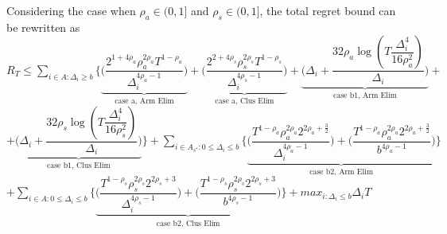 \begin{remark}
\label{App:C:Rem:1}
Considering the case when $\rho_{a}\in (0,1]$ and $\rho_{s}\in (0,1]$, the total regret bound can be rewritten as
\newline $R_{T}\leq \sum_{i\in A:\Delta_{i}\geq b} \bigg\lbrace \underbrace{\bigg(\dfrac{2^{1+4\rho_{a}}\rho_{a}^{2\rho_{a}}T^{1-\rho_{a}}}{\Delta_{i}^{4\rho_{a}-1}}\bigg)}_{\text{case a, Arm Elim}} + \underbrace{\bigg(\dfrac{2^{2+4\rho_{s}}\rho_{s}^{2\rho_{s}}T^{1-\rho_{s}}}{\Delta_{i}^{4\rho_{s}-1}}\bigg)}_{\text{case a, Clus Elim}} + \underbrace{\bigg(\Delta_{i}+\dfrac{32\rho_{a}\log{(T\dfrac{\Delta_{i}^{4}}{16\rho_{a}^{2}})}}{\Delta_{i}}\bigg)}_{\text{case b1, Arm Elim}} +$ \newline $ + \underbrace{\bigg(\Delta_{i}+\dfrac{32\rho_{s}\log{(T\dfrac{\Delta_{i}^{4}}{16\rho_{s}^{2}})}}{\Delta_{i}}\bigg)}_{\text{case b1, Clus Elim}}\bigg\rbrace + \sum_{i\in A_{s^{*}}:0\leq\Delta_{i}\leq b}\bigg\lbrace \underbrace{\bigg(\dfrac{T^{1-\rho_{a}}\rho_{a}^{2\rho_{a}}2^{2\rho_{a}+\frac{3}{2}}}{\Delta_{i}^{4\rho_{a}-1}} \bigg)+\bigg(\dfrac{T^{1-\rho_{a}}\rho_{a}^{2\rho_{a}}2^{2\rho_{a}+\frac{3}{2}}}{b^{4\rho_{a} -1}} \bigg)}_{\text{case b2, Arm Elim}}\bigg\rbrace$\newline$ +  \sum_{i\in A:0\leq\Delta_{i}\leq b}\bigg\lbrace\underbrace{\bigg(\dfrac{T^{1-\rho_{s}}\rho_{s}^{2\rho_{s}}2^{2\rho_{s}+3}}{\Delta_{i}^{4\rho_{s}-1}} \bigg)+\bigg(\dfrac{T^{1-\rho_{s}}\rho_{s}^{2\rho_{s}}2^{2\rho_{s}+3}}{b^{4\rho_{s} -1}} \bigg)}_{\text{case b2, Clus Elim}} \bigg\rbrace + max_{i:\Delta_{i}\leq b}\Delta_{i}T   $


\end{remark}
